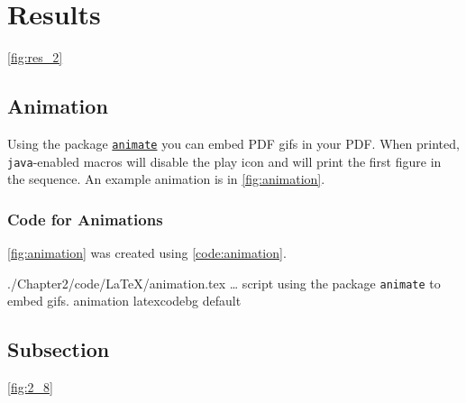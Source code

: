 \documentclass[../Dissertation]{subfiles}
\begin{document}
\section{Results}\label{results_2}
    \lipsum[64] \cref{fig:res_2}
    
    
    \lipsum[64-71]
    
\subsection{Animation}
    Using the  package
    \href{https://ctan.org/pkg/animate?lang=en}{\texttt{animate}}
    you can embed PDF gifs in your PDF.  When printed, \texttt{java}-enabled
    macros will disable the play icon and will print the first figure in the
    sequence.  An example animation is in \cref{fig:animation}.
    

\subsubsection{ Code for Animations}
    \cref{fig:animation} was created using \cref{code:animation}.
    
        {./Chapter2/code/LaTeX/animation.tex}
        {\ldots {} script using the package \texttt{animate} to embed gifs.}
        {animation}
        {\footnotesize}
        {latexcodebg}
        {default}

\subsection{Subsection}
    \lipsum[60-70] \cref{fig:2_8}
\end{document}
